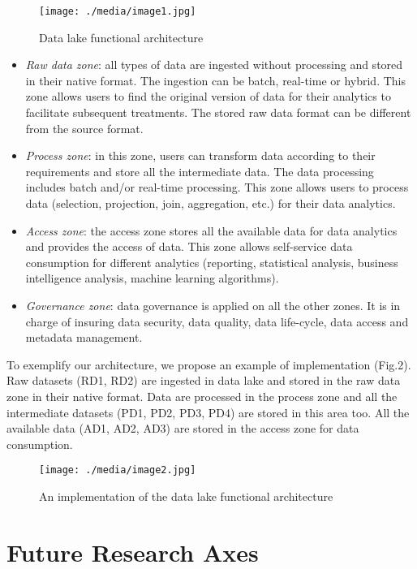 \documentclass[a4paper,12pt,notitlepage,twoside,openright]{article}
\begin{document}
\begin{figure}
\centering
\texttt{[image: ./media/image1.jpg]}
\caption{Data lake functional architecture}
\end{figure}

\begin{itemize}
\item
  \emph{Raw data zone}: all types of data are ingested without
  processing and stored in their native format. The ingestion can be
  batch, real-time or hybrid. This zone allows users to find the
  original version of data for their analytics to facilitate subsequent
  treatments. The stored raw data format can be different from the
  source format.
\item
  \emph{Process zone}: in this zone, users can transform data according
  to their requirements and store all the intermediate data. The data
  processing includes batch and/or real-time processing. This zone
  allows users to process data (selection, projection, join,
  aggregation, etc.) for their data analytics.
\item
  \emph{Access zone}: the access zone stores all the available data for
  data analytics and provides the access of data. This zone allows
  self-service data consumption for different analytics (reporting,
  statistical analysis, business intelligence analysis, machine learning
  algorithms).
\item
  \emph{Governance zone}: data governance is applied on all the other
  zones. It is in charge of insuring data security, data quality, data
  life-cycle, data access and metadata management.
\end{itemize}

To exemplify our architecture, we propose an example of implementation
(Fig.2). Raw datasets (RD1, RD2) are ingested in data lake and stored in
the raw data zone in their native format. Data are processed in the
process zone and all the intermediate datasets (PD1, PD2, PD3, PD4) are
stored in this area too. All the available data (AD1, AD2, AD3) are
stored in the access zone for data consumption.

\begin{figure}
\centering
\texttt{[image: ./media/image2.jpg]}
\caption{An implementation of the data lake functional
architecture}
\end{figure}

\hypertarget{future-research-axes}{%
\section{Future Research Axes}\label{future-research-axes}}
\end{document}
